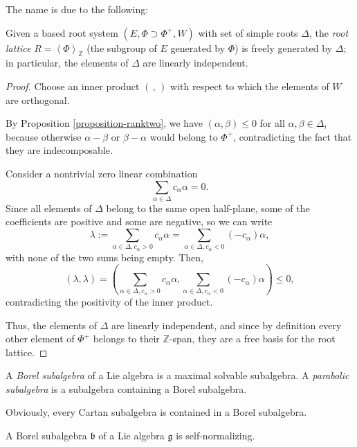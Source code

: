 The name is due to the following:

\begin{proposition}
\label{proposition-basis-rootsystem}
Given a based root system $(E,\Phi \supset \Phi^+, W)$ with set of simple roots $\Delta$,
the \emph{root lattice} $R=\left< \Phi \right>_{\mathbb Z}$ (the subgroup of $E$ generated by $\Phi$) is freely generated by $\Delta$; in particular, the elements of $\Delta$ are linearly independent.
\end{proposition}

\begin{proof}
Choose an inner product $(\, , \, )$ with respect to which the elements of $W$ are orthogonal. 

By Proposition \ref{proposition-ranktwo}, we have $(\alpha,\beta)\le 0$ for all $\alpha,\beta\in\Delta$, because otherwise $\alpha-\beta$ or $\beta-\alpha$ would belong to $\Phi^+$, contradicting the fact that they are indecomposable.

Consider a nontrivial zero linear combination
$$ \sum_{\alpha\in \Delta} c_\alpha \alpha = 0.$$
 Since all elements of $\Delta$ belong to the same open half-plane, some of the coefficients are positive and some are negative, so we can write
 $$ \lambda:= \sum_{\alpha\in \Delta, c_\alpha>0} c_\alpha \alpha = \sum_{\alpha\in \Delta, c_\alpha< 0} (-c_\alpha)\alpha,$$
 with none of the two sums being empty. Then, 
 $$(\lambda,\lambda) = \left(\sum_{\alpha\in \Delta, c_\alpha>0} c_\alpha \alpha, \sum_{\alpha\in \Delta, c_\alpha< 0} (-c_\alpha)\alpha\right) \le 0,$$
contradicting the positivity of the inner product. 

Thus, the elements of $\Delta$ are linearly independent, and since by definition every other element of $\Phi^+$ belongs to their $\mathbb Z$-span, they are a free basis for the root lattice.
\end{proof}





\begin{definition}
\label{definition-Borel-parabolic}
 A {\it Borel subalgebra} of a Lie algebra is a maximal solvable subalgebra. A {\it parabolic subalgebra} is a subalgebra containing a Borel subalgebra.
\end{definition}

Obviously, every Cartan subalgebra is contained in a Borel subalgebra. 

\begin{lemma}
 \label{lemma-BSA-self-normalizing}
A Borel subalgebra $\mathfrak b$ of a Lie algebra $\mathfrak g$ is self-normalizing.
\end{lemma}

